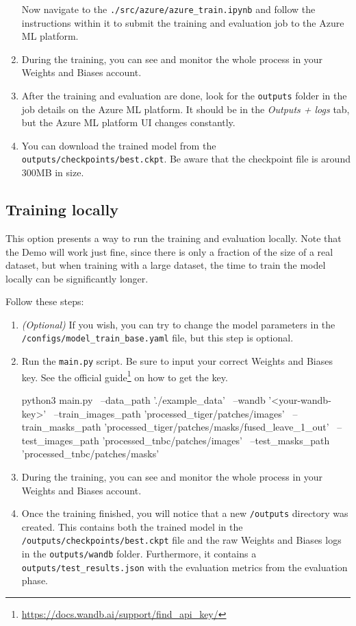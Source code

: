\begin{enumerate}
  Now navigate to the
  \texttt{./src/azure/azure\_train.ipynb} and follow
  the instructions within it to submit the training and evaluation job
  to the Azure ML platform.
\item
  During the training, you can see and monitor the whole process in your
  Weights and Biases account.
\item
  After the training and evaluation are done, look for the
  \texttt{outputs} folder in the job details on the Azure ML platform.
  It should be in the \emph{Outputs + logs} tab, but the Azure ML
  platform UI changes constantly.
\item
  You can download the trained model from the
  \texttt{outputs/checkpoints/best.ckpt}. Be aware that the checkpoint
  file is around 300MB in size.
\end{enumerate}

\subsection{Training locally}\label{b-training-locally}

This option presents a way to run the training and evaluation
locally. Note that the Demo will work just fine, since there is only a
fraction of the size of a real dataset, but when training with a large
dataset, the time to train the model locally can be significantly
longer.

Follow these steps:

\begin{enumerate}
    \item \emph{(Optional)} If you wish, you can try to change the model parameters in the \texttt{/configs/model\_train\_base.yaml} file, but this step is optional.
    \item Run the \texttt{main.py} script. Be sure to input your correct Weights and Biases key. See the official guide\footnote{\url{https://docs.wandb.ai/support/find_api_key/}} on how to get the key.
    \begin{bashlisting}
python3 main.py \
  --data_path './example_data' \
  --wandb '<your-wandb-key>' \
  --train_images_path 'processed_tiger/patches/images' \
  --train_masks_path 'processed_tiger/patches/masks/fused_leave_1_out' \
  --test_images_path 'processed_tnbc/patches/images' \
  --test_masks_path 'processed_tnbc/patches/masks'
\end{bashlisting}
    
    \item During the training, you can see and monitor the whole process in your Weights and Biases account.
    \item Once the training finished, you will notice that a new \texttt{/outputs} directory was created. This contains both the trained model in the \\
    \texttt{/outputs/checkpoints/best.ckpt} file and the raw Weights and Biases logs in the \texttt{outputs/wandb} folder. Furthermore, it contains a \\
    \texttt{outputs/test\_results.json} with the evaluation metrics from the evaluation phase.
\end{enumerate}

